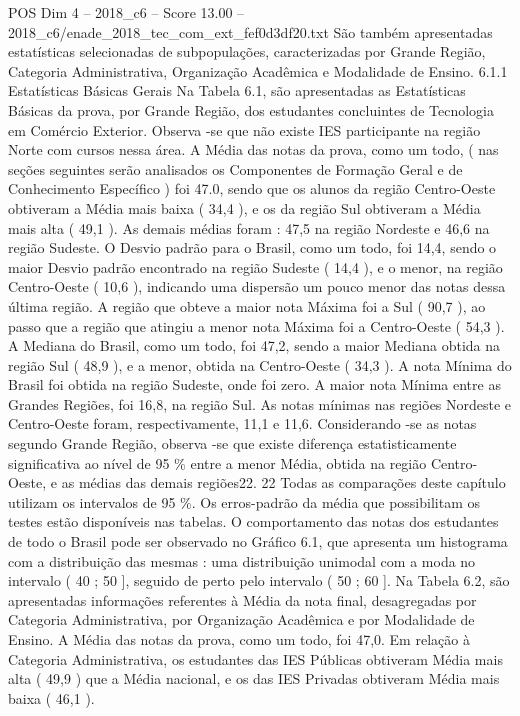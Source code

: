 \begin{textsample}{POS Dim 4 – 2018\_c6 – Score 13.00 – 2018\_c6/enade\_2018\_tec\_com\_ext\_fef0d3df20.txt}
São também apresentadas estatísticas selecionadas de subpopulações, caracterizadas por Grande Região, Categoria Administrativa, Organização Acadêmica e Modalidade de Ensino. 6.1.1 Estatísticas Básicas Gerais Na Tabela 6.1, são apresentadas as Estatísticas Básicas da prova, por Grande Região, dos estudantes concluintes de Tecnologia em Comércio Exterior.
Observa -se que não existe IES participante na região Norte com cursos nessa área.
A Média das notas da prova, como um todo, ( nas seções seguintes serão analisados os Componentes de Formação Geral e de Conhecimento Específico ) foi 47.0, sendo que os alunos da região Centro-Oeste obtiveram a Média mais baixa ( 34,4 ), e os da região Sul obtiveram a Média mais alta ( 49,1 ).
As demais médias foram : 47,5 na região Nordeste e 46,6 na região Sudeste.
O Desvio padrão para o Brasil, como um todo, foi 14,4, sendo o maior Desvio padrão encontrado na região Sudeste ( 14,4 ), e o menor, na região Centro-Oeste ( 10,6 ), indicando uma dispersão um pouco menor das notas dessa última região.
A região que obteve a maior nota Máxima foi a Sul ( 90,7 ), ao passo que a região que atingiu a menor nota Máxima foi a Centro-Oeste ( 54,3 ).
A Mediana do Brasil, como um todo, foi 47,2, sendo a maior Mediana obtida na região Sul ( 48,9 ), e a menor, obtida na Centro-Oeste ( 34,3 ).
A nota Mínima do Brasil foi obtida na região Sudeste, onde foi zero.
A maior nota Mínima entre as Grandes Regiões, foi 16,8, na região Sul.
As notas mínimas nas regiões Nordeste e Centro-Oeste foram, respectivamente, 11,1 e 11,6.
Considerando -se as notas segundo Grande Região, observa -se que existe diferença estatisticamente significativa ao nível de 95 \% entre a menor Média, obtida na região Centro-Oeste, e as médias das demais regiões22. 22 Todas as comparações deste capítulo utilizam os intervalos de 95 \%.
Os erros-padrão da média que possibilitam os testes estão disponíveis nas tabelas.
O comportamento das notas dos estudantes de todo o Brasil pode ser observado no Gráfico 6.1, que apresenta um histograma com a distribuição das mesmas : uma distribuição unimodal com a moda no intervalo ( 40 ; 50 ], seguido de perto pelo intervalo ( 50 ; 60 ].
Na Tabela 6.2, são apresentadas informações referentes à Média da nota final, desagregadas por Categoria Administrativa, por Organização Acadêmica e por Modalidade de Ensino.
A Média das notas da prova, como um todo, foi 47,0.
Em relação à Categoria Administrativa, os estudantes das IES Públicas obtiveram Média mais alta ( 49,9 ) que a Média nacional, e os das IES Privadas obtiveram Média mais baixa ( 46,1 ).

\end{textsample}
